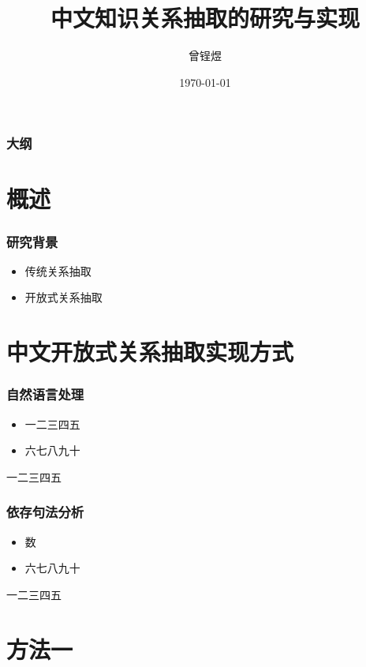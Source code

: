 ﻿\documentclass[12pt]{ctexbeamer}	%
\title{中文知识关系抽取的研究与实现}	%
\author[曾锃煜]{曾锃煜}
\institute[中国科学技术大学]{中国科学技术大学，计算机科学与技术系}	%
\date{\today}
\begin{document}
\begin{frame}
\titlepage
\end{frame}


\begin{frame}
\frametitle{大纲}
\tableofcontents
\end{frame}


\section{概述}

\begin{frame}
\frametitle{研究背景}
\begin{itemize}
\item<1-> 传统关系抽取
\item<2-> 开放式关系抽取
\end{itemize}
\end{frame}


\section{中文开放式关系抽取实现方式}

\begin{frame}
\frametitle{自然语言处理}
\begin{itemize}
\item 一二三四五
\item \alert{六七八九十}
\end{itemize}
\pause
一二三四五
\end{frame}

\begin{frame}
\frametitle{依存句法分析}
\begin{itemize}
\item 数
\item \alert{六七八九十}
\end{itemize}
\pause
一二三四五
\end{frame}


\section{方法一}
\end{document}
